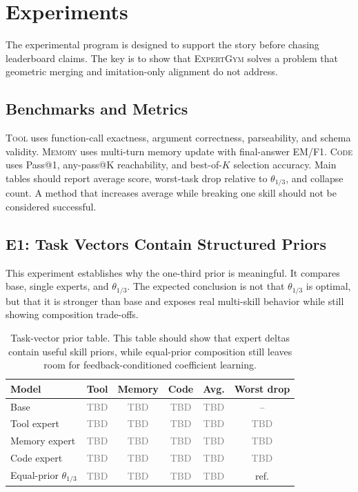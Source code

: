 \documentclass[11pt]{article}
\newcommand{\method}{\textsc{ExpertGym}\xspace}
\newcommand{\tool}{\textsc{Tool}\xspace}
\newcommand{\mem}{\textsc{Memory}\xspace}
\newcommand{\code}{\textsc{Code}\xspace}
\newcommand{\eqmerge}{\theta_{1/3}}
\newcommand{\TODO}{\textcolor{gray}{TBD}}
\begin{document}
\section{Experiments}

The experimental program is designed to support the story before chasing leaderboard claims.  The key is to show that \method solves a problem that geometric merging and imitation-only alignment do not address.

\subsection{Benchmarks and Metrics}

\tool uses function-call exactness, argument correctness, parseability, and schema validity.  \mem uses multi-turn memory update with final-answer EM/F1.  \code uses Pass@1, any-pass@K reachability, and best-of-$K$ selection accuracy.  Main tables should report average score, worst-task drop relative to $\eqmerge$, and collapse count.  A method that increases average while breaking one skill should not be considered successful.

\subsection{E1: Task Vectors Contain Structured Priors}

This experiment establishes why the one-third prior is meaningful.  It compares base, single experts, and $\eqmerge$.  The expected conclusion is not that $\eqmerge$ is optimal, but that it is stronger than base and exposes real multi-skill behavior while still showing composition trade-offs.

\begin{table}[t]
\centering
\small
\setlength{\tabcolsep}{4pt}
\begin{tabular}{lccccc}
\toprule
Model & Tool & Memory & Code & Avg. & Worst drop \\
\midrule
Base & \TODO & \TODO & \TODO & \TODO & -- \\
Tool expert & \TODO & \TODO & \TODO & \TODO & \TODO \\
Memory expert & \TODO & \TODO & \TODO & \TODO & \TODO \\
Code expert & \TODO & \TODO & \TODO & \TODO & \TODO \\
Equal-prior $\eqmerge$ & \TODO & \TODO & \TODO & \TODO & ref. \\
\bottomrule
\end{tabular}
\caption{Task-vector prior table.  This table should show that expert deltas contain useful skill priors, while equal-prior composition still leaves room for feedback-conditioned coefficient learning.}
\label{tab:priors}
\end{table}
\end{document}
